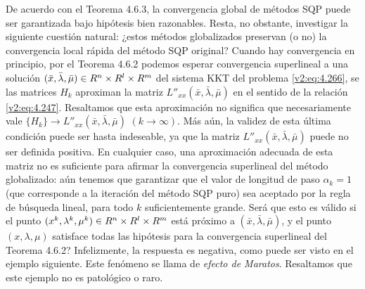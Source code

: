 De acuerdo con el Teorema 4.6.3, la convergencia global de métodos SQP puede ser garantizada bajo hipótesis bien razonables. Resta, no obstante, investigar la siguiente cuestión natural: ¿estos métodos globalizados preservan (o no) la convergencia local rápida del método SQP original? Cuando hay convergencia en principio, por el Teorema 4.6.2 podemos esperar convergencia superlineal a una solución $(\bar{x}, \bar{\lambda}, \bar{\mu}) \in R^n \times R^l \times R^m$ del sistema KKT del problema \eqref{v2:eq:4.266}, se las matrices $H_k$ aproximan la matriz $L''_{xx}(\bar{x}, \bar{\lambda}, \bar{\mu})$ en el sentido de la relación \eqref{v2:eq:4.247}. Resaltamos que esta aproximación no significa que necesariamente vale $\{H_k\} \to L''_{xx}(\bar{x}, \bar{\lambda}, \bar{\mu})$ $(k \to \infty)$. Más aún, la validez de esta última condición puede ser hasta indeseable, ya que la matriz $L''_{xx}(\bar{x}, \bar{\lambda}, \bar{\mu})$ puede no ser definida positiva. En cualquier caso, una aproximación adecuada de esta matriz no es suficiente para afirmar la convergencia superlineal del método globalizado: aún tenemos que garantizar que el valor de longitud de paso $\alpha_k = 1$ (que corresponde a la iteración del método SQP puro) sea aceptado por la regla de búsqueda lineal, para todo $k$ suficientemente grande. Será que esto es válido si el punto $(x^k, \lambda^k, \mu^k) \in R^n \times R^l \times R^m$ está próximo a $(\bar{x}, \bar{\lambda}, \bar{\mu})$, y el punto $(x, \lambda, \mu)$ satisface todas las hipótesis para la convergencia superlineal del Teorema 4.6.2? Infelizmente, la respuesta es negativa, como puede ser visto en el ejemplo siguiente. Este fenómeno se llama de \textit{efecto de Maratos}. Resaltamos que este ejemplo no es patológico o raro.

